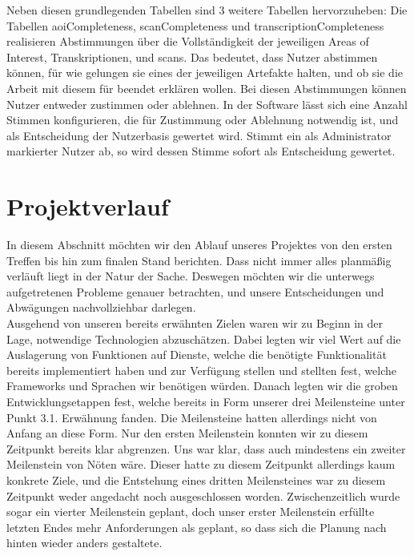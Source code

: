 \documentclass{article}
\begin{document}
Neben diesen grundlegenden Tabellen sind 3 weitere Tabellen hervorzuheben:
Die Tabellen aoiCompleteness, scanCompleteness und transcriptionCompleteness
realisieren Abstimmungen über die Vollständigkeit der jeweiligen Areas of Interest, Transkriptionen, und scans.
Das bedeutet, dass Nutzer abstimmen können,
für wie gelungen sie eines der jeweiligen Artefakte halten,
und ob sie die Arbeit mit diesem für beendet erklären wollen.
Bei diesen Abstimmungen können Nutzer entweder zustimmen oder ablehnen.
In der Software lässt sich eine Anzahl Stimmen konfigurieren,
die für Zustimmung oder Ablehnung notwendig ist,
und als Entscheidung der Nutzerbasis gewertet wird.
Stimmt ein als Administrator markierter Nutzer ab,
so wird dessen Stimme sofort als Entscheidung gewertet.

\section{Projektverlauf}
In diesem Abschnitt möchten wir den Ablauf unseres Projektes von den ersten Treffen bis hin zum finalen Stand berichten. Dass nicht immer alles planmäßig verläuft liegt in der Natur der Sache. Deswegen möchten wir die unterwegs aufgetretenen Probleme genauer betrachten, und unsere Entscheidungen und Abwägungen nachvollziehbar darlegen. \\
Ausgehend von unseren bereits erwähnten Zielen waren wir zu Beginn in der Lage, notwendige Technologien abzuschätzen. Dabei legten wir viel Wert auf die Auslagerung von Funktionen auf Dienste, welche die benötigte Funktionalität bereits implementiert haben und zur Verfügung stellen und stellten fest, welche Frameworks und Sprachen wir benötigen würden. Danach legten wir die groben Entwicklungsetappen fest, welche bereits in Form unserer drei Meilensteine unter Punkt 3.1. Erwähnung fanden. Die Meilensteine hatten allerdings nicht von Anfang an diese Form. Nur den ersten Meilenstein konnten wir zu diesem Zeitpunkt bereits klar abgrenzen. Uns war klar, dass auch mindestens ein zweiter Meilenstein von Nöten wäre. Dieser hatte zu diesem Zeitpunkt allerdings kaum konkrete Ziele, und die Entstehung eines dritten Meilensteines war zu diesem Zeitpunkt weder angedacht noch ausgeschlossen worden. Zwischenzeitlich wurde sogar ein vierter Meilenstein geplant, doch unser erster Meilenstein erfüllte letzten Endes mehr Anforderungen als geplant, so dass sich die Planung nach hinten wieder anders gestaltete.
\end{document}
